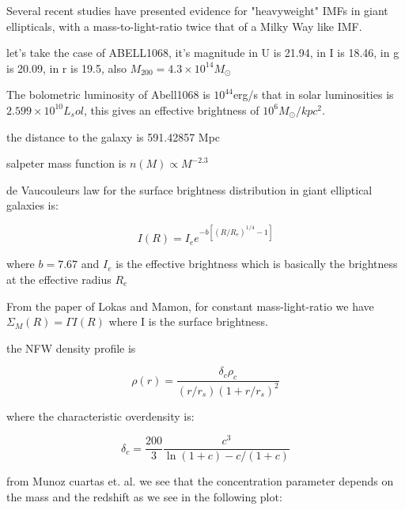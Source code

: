 Several recent studies have presented evidence for "heavyweight" IMFs in giant ellipticals, with a mass-to-light-ratio twice that of a Milky Way like IMF.

let's take the case of ABELL1068, it's magnitude in U is 21.94, in I is 18.46, in g is 20.09, in r is 19.5, also $M_{200}=4.3\times 10^{14}M_{\odot}$

The bolometric luminosity of Abell1068 is $10^44$erg/s that in solar luminosities is $2.599\times 10^{10} L_sol$, this gives an effective brightness of $10^{6}M_{\odot}/kpc^2$.

the distance to the galaxy is 591.42857 Mpc	

salpeter mass function is $n(M)\propto M^{-2.3}$  

de Vaucouleurs law for the surface brightness distribution in giant elliptical galaxies is:

\begin{equation}
I(R)=I_{e}e^{-b\left[\left(R/R_{e}\right)^{1/4}-1\right]}
\end{equation}

where $b=7.67$ and $I_{e}$ is the effective brightness which is basically the brightness at the effective radius $R_{e}$

From the paper of Lokas and Mamon, for constant mass-light-ratio we have $\Sigma_{M}(R)=\Gamma I(R)$ where I is the surface brightness.

the NFW density profile is 

\begin{equation}
\rho(r)=\frac{\delta_{c}\rho_{c}}{(r/r_{s})(1+r/r_{s})^{2}}
\end{equation}

where the characteristic overdensity is:

\begin{equation}
\delta_{c}=\frac{200}{3}\frac{c^{3}}{\ln{(1+c)}-c/(1+c)}
\end{equation}

from Munoz cuartas et. al. we see that the concentration parameter depends on the mass and the redshift as we see in the following plot:

